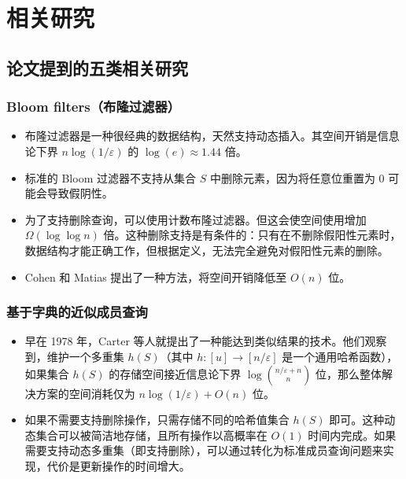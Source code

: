 \documentclass[UTF8,11pt,a4paper]{ctexart}
\begin{document}
\section{相关研究}

\subsection{论文提到的五类相关研究}

\subsubsection{Bloom filters（布隆过滤器）}
\begin{itemize}
    \item 布隆过滤器是一种很经典的数据结构，天然支持动态插入。其空间开销是信息论下界 $n\log(1/\varepsilon)$ 的 $\log(e) \approx 1.44$ 倍。
    \item 标准的 Bloom 过滤器不支持从集合 $S$ 中删除元素，因为将任意位重置为 0 可能会导致假阴性。
    \item 为了支持删除查询，可以使用计数布隆过滤器。但这会使空间使用增加 $\Omega(\log\log n)$ 倍。这种删除支持是有条件的：只有在不删除假阳性元素时，数据结构才能正确工作，但根据定义，无法完全避免对假阳性元素的删除。
    \item Cohen 和 Matias 提出了一种方法，将空间开销降低至 $O(n)$ 位。
\end{itemize}

\subsubsection{基于字典的近似成员查询}
\begin{itemize}
    \item 早在 1978 年，Carter 等人就提出了一种能达到类似结果的技术。他们观察到，维护一个多重集 $h(S)$（其中 $h : [u] \to [n/\varepsilon]$ 是一个通用哈希函数），如果集合 $h(S)$ 的存储空间接近信息论下界 $\log\binom{n/\varepsilon+n}{n}$ 位，那么整体解决方案的空间消耗仅为 $n\log(1/\varepsilon) + O(n)$ 位。
    \item 如果不需要支持删除操作，只需存储不同的哈希值集合 $h(S)$ 即可。这种动态集合可以被简洁地存储，且所有操作以高概率在 $O(1)$ 时间内完成。如果需要支持动态多重集（即支持删除），可以通过转化为标准成员查询问题来实现，代价是更新操作的时间增大。
\end{itemize}
\end{document}
